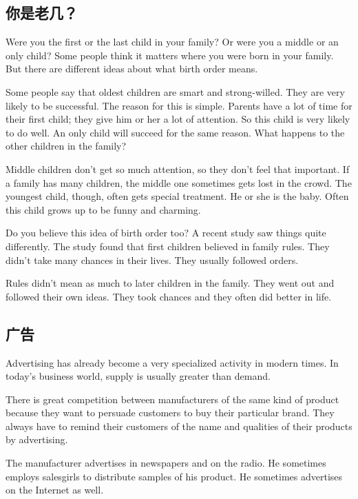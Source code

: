 \subsection{你是老几？}
Were you the first or the last child in your family? Or were
you a middle or an only child? Some people think it matters
where you were born in your family. But there are different
ideas about what birth order means.

Some people say that oldest children are smart
and strong-willed. They are very likely to be successful.
The reason for this is simple. Parents have a lot of time for
their first child; they give him or her a lot of attention. So
this child is very likely to do well. An only child will
succeed for the same reason. What happens to the other
children in the family?

Middle children don't get so much attention, so they
don't feel that important. If a family has many children, the
middle one sometimes gets lost in the crowd. The youngest
child, though, often gets special treatment. He or she is the
baby. Often this child grows up to be funny and charming.

Do you believe this idea of birth order too? A recent
study saw things quite differently. The study found that first
children believed in family rules. They didn't take many
chances in their lives. They usually followed orders.

Rules didn't mean as much to later children in the
family. They went out and followed their own ideas. They took chances and they often did better in life.
\subsection{广告}
Advertising has already become a very specialized activity
in modern times. In today's business world, supply is
usually greater than demand.

There is great competition between manufacturers of the
same kind of product because they want to persuade
customers to buy their particular brand. They always
have to remind their customers of the name and qualities
of their products by advertising.

The manufacturer advertises in newspapers and on
the radio. He sometimes employs salesgirls to distribute
samples of his product. He sometimes advertises on the
Internet as well.

